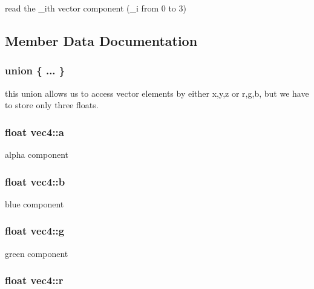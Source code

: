 read the \+\_\+i\textquotesingle{}th vector component (\+\_\+i from 0 to 3) 



\subsection{Member Data Documentation}
\subsubsection[{\texorpdfstring{"@7}{@7}}]{\setlength{\rightskip}{0pt plus 5cm}union \{ ... \} }\hypertarget{classvec4_a174554ac005f5970aede30eb208854f1}{}\label{classvec4_a174554ac005f5970aede30eb208854f1}
this union allows us to access vector elements by either x,y,z or r,g,b, but we have to store only three floats. 
\subsubsection[{\texorpdfstring{a}{a}}]{\setlength{\rightskip}{0pt plus 5cm}float vec4\+::a}\hypertarget{classvec4_ac1c847c2cd65c10fd059fceb8e57a5f6}{}\label{classvec4_ac1c847c2cd65c10fd059fceb8e57a5f6}


alpha component 

\subsubsection[{\texorpdfstring{b}{b}}]{\setlength{\rightskip}{0pt plus 5cm}float vec4\+::b}\hypertarget{classvec4_a62421478df6548c8e5e24d33345e3417}{}\label{classvec4_a62421478df6548c8e5e24d33345e3417}


blue component 

\subsubsection[{\texorpdfstring{g}{g}}]{\setlength{\rightskip}{0pt plus 5cm}float vec4\+::g}\hypertarget{classvec4_aa626a2728056a1b410fb8e133bdffd05}{}\label{classvec4_aa626a2728056a1b410fb8e133bdffd05}


green component 

\subsubsection[{\texorpdfstring{r}{r}}]{\setlength{\rightskip}{0pt plus 5cm}float vec4\+::r}\hypertarget{classvec4_a1682827e4304b44e6f768d616cdf3899}{}\label{classvec4_a1682827e4304b44e6f768d616cdf3899}


